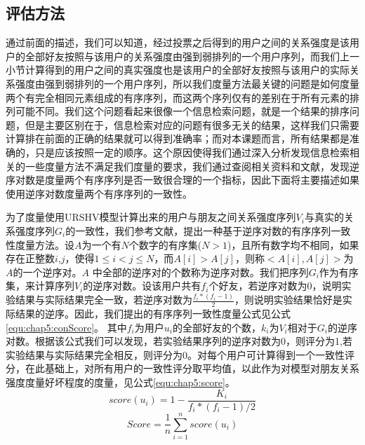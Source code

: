 \subsection{评估方法}
通过前面的描述，我们可以知道，经过投票之后得到的用户之间的关系强度是该用户的全部好友按照与该用户的关系强度由强到弱排列的一个用户序列，而我们上一小节计算得到的用户之间的真实强度也是该用户的全部好友按照与该用户的实际关系强度由强到弱排列的一个用户序列，所以我们度量方法最关键的问题是如何度量两个有完全相同元素组成的有序序列，而这两个序列仅有的差别在于所有元素的排列可能不同。我们这个问题看起来很像一个信息检索问题，就是一个结果的排序问题，但是主要区别在于，信息检索对应的问题有很多无关的结果，这样我们只需要计算排在前面的正确的结果就可以得到准确率；而对本课题而言，所有结果都是准确的，只是应该按照一定的顺序。这个原因使得我们通过深入分析发现信息检索相关的一些度量方法不满足我们度量的要求，我们通过查阅相关资料和文献，发现逆序对数是度量两个有序序列是否一致很合理的一个指标，因此下面将主要描述如果使用逆序对数度量两个有序序列的一致性。
\par 为了度量使用URSHV模型计算出来的用户与朋友之间关系强度序列$V_{i}$与真实的关系强度序列$G_{i}$的一致性，我们参考文献\cite{wikiInversion}，提出一种基于逆序对数的有序序列一致性度量方法。设$A$为一个有$N$个数字的有序集($N>1$)，且所有数字均不相同，如果存在正整数$i$,$j$，使得$1\leq i<j\leq N$，而$A[i]>A[j]$，则称$<A[i],A[j]>$为$A$的一个逆序对。$A$ 中全部的逆序对的个数称为逆序对数。我们把序列$G_{i}$作为有序集，来计算序列$V_{i}$的逆序对数。设该用户共有$f_{i}$个好友，若逆序对数为0，说明实验结果与实际结果完全一致，若逆序对数为$\frac{f_{i}*(f_{i}-1)}{2}$，则说明实验结果恰好是实际结果的逆序。因此，我们提出的有序序列一致性度量公式见公式\ref{equ:chap5:conScore}。 其中$f_{i}$为用户$u_{i}$的全部好友的个数，$k_{i}$为$V_{i}$相对于$G_{i}$的逆序对数。根据该公式我们可以发现，若实验结果序列的逆序对数为0，则评分为1,若实验结果与实际结果完全相反，则评分为0。对每个用户可计算得到一个一致性评分，在此基础上，对所有用户的一致性评分取平均值，以此作为对模型对朋友关系强度度量好坏程度的度量，见公式\ref{equ:chap5:score}。
\begin{equation}
\label{equ:chap5:conScore}
score(u_{i})=1-\frac{K_{i}}{f_{i}\ast(f_{i}-1)/2}
\end{equation}
\begin{equation}
\label{equ:chap5:score}
Score=\frac{1}{n}\sum_{i=1}^{n}score(u_{i})
\end{equation}
